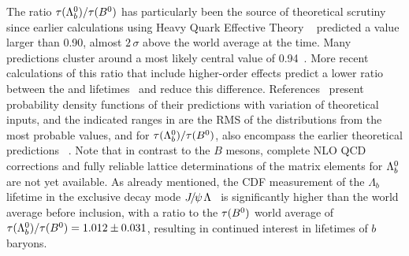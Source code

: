 The ratio $\tau(\Lambda_b^0)/\tau(B^0)$ has particularly
been the source of theoretical
scrutiny since earlier calculations using Heavy Quark Effective Theory%
~\cite{Shifman:1986mx,*Chay:1990da,*Bigi:1992su,*Bigi:1992su_erratum,Voloshin:1999pz,*Guberina:1999bw,*Neubert:1996we,*Bigi:1997fj}
predicted a value larger than 0.90, almost $2\,\sigma$ 
above the world average at the time. 
Many predictions cluster around a most likely central value
of 0.94~\cite{Uraltsev:1996ta,*Pirjol:1998ur,*Colangelo:1996ta,*DiPierro:1999tb}.
More recent calculations
of this ratio that include higher-order effects predict a
lower ratio between the
\Lb and \Bd lifetimes~\cite{Tarantino:2003qw,*Gabbiani:2003pq,Gabbiani:2004tp}
and reduce this difference.
References~\cite{Tarantino:2003qw,*Gabbiani:2003pq,Gabbiani:2004tp} present probability density functions
of their predictions with variation of theoretical inputs, and the
indicated ranges in 
are the RMS of the distributions from the most probable values, and for 
$\tau(\Lambda_b^0)/\tau(B^0)$, also encompass the earlier theoretical predictions%
~\cite{Shifman:1986mx,*Chay:1990da,*Bigi:1992su,*Bigi:1992su_erratum,Voloshin:1999pz,*Guberina:1999bw,*Neubert:1996we,*Bigi:1997fj,Uraltsev:1996ta,*Pirjol:1998ur,*Colangelo:1996ta,*DiPierro:1999tb}.
Note that in contrast to the $B$ mesons, complete NLO QCD
corrections and
fully reliable lattice
determinations of the matrix elements for $\Lambda_b^0$ are not
yet available.
As already mentioned, the CDF measurement of the $\Lambda_b$ lifetime
in the exclusive decay mode ${J\mskip -3mu/\mskip -2mu\psi\mskip 2mu} \Lambda$~\cite{Aaltonen:2014wfa,*Aaltonen:2014wfa_cont} 
is significantly 
higher than the world average before inclusion, with a ratio
to the $\tau(B^0)$ world average of 
$\tau(\Lambda_b^0)/\tau(B^0) = 1.012 \pm 0.031$, 
%
resulting in continued interest in lifetimes of $b$ baryons.


